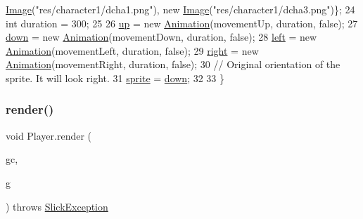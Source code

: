 \begin{DoxyCode}
      \mbox{\hyperlink{classorg_1_1newdawn_1_1slick_1_1_image}{Image}}(\textcolor{stringliteral}{"res/character1/dcha1.png"}), \textcolor{keyword}{new} \mbox{\hyperlink{classorg_1_1newdawn_1_1slick_1_1_image}{Image}}(\textcolor{stringliteral}{"res/character1/dcha3.png"})\};
24        \textcolor{keywordtype}{int} duration = 300;
25        
26         \mbox{\hyperlink{class_player_a0c55658c20ec3c38f7f576cc2cf82159}{up}} = \textcolor{keyword}{new} \mbox{\hyperlink{classorg_1_1newdawn_1_1slick_1_1_animation}{Animation}}(movementUp, duration, \textcolor{keyword}{false});
27         \mbox{\hyperlink{class_player_afd6877026455f117ab11a7dff0ebc66b}{down}} = \textcolor{keyword}{new} \mbox{\hyperlink{classorg_1_1newdawn_1_1slick_1_1_animation}{Animation}}(movementDown, duration, \textcolor{keyword}{false});
28         \mbox{\hyperlink{class_player_a8498ed1f7da9f5eece81ff568b7cfb1e}{left}} = \textcolor{keyword}{new} \mbox{\hyperlink{classorg_1_1newdawn_1_1slick_1_1_animation}{Animation}}(movementLeft, duration, \textcolor{keyword}{false});
29         \mbox{\hyperlink{class_player_a64f2b14c132dcace9efb06b2cfb499b2}{right}} = \textcolor{keyword}{new} \mbox{\hyperlink{classorg_1_1newdawn_1_1slick_1_1_animation}{Animation}}(movementRight, duration, \textcolor{keyword}{false});
30         \textcolor{comment}{// Original orientation of the sprite. It will look right.}
31         \mbox{\hyperlink{class_player_a500d31b34518044f505159570d00a774}{sprite}} = \mbox{\hyperlink{class_player_afd6877026455f117ab11a7dff0ebc66b}{down}};
32  
33     \}
\end{DoxyCode}
\mbox{\label{class_player_a79907712a1c54d014a17dd206aa1921a}} 
\subsubsection{\texorpdfstring{render()}{render()}}
{\footnotesize\ttfamily void Player.\+render (\begin{DoxyParamCaption}\item[{\mbox{\hyperlink{classorg_1_1newdawn_1_1slick_1_1_game_container}{Game\+Container}}}]{gc,  }\item[{\mbox{\hyperlink{classorg_1_1newdawn_1_1slick_1_1_graphics}{Graphics}}}]{g }\end{DoxyParamCaption}) throws \mbox{\hyperlink{classorg_1_1newdawn_1_1slick_1_1_slick_exception}{Slick\+Exception}}\hspace{0.3cm}{\ttfamily [inline]}}


